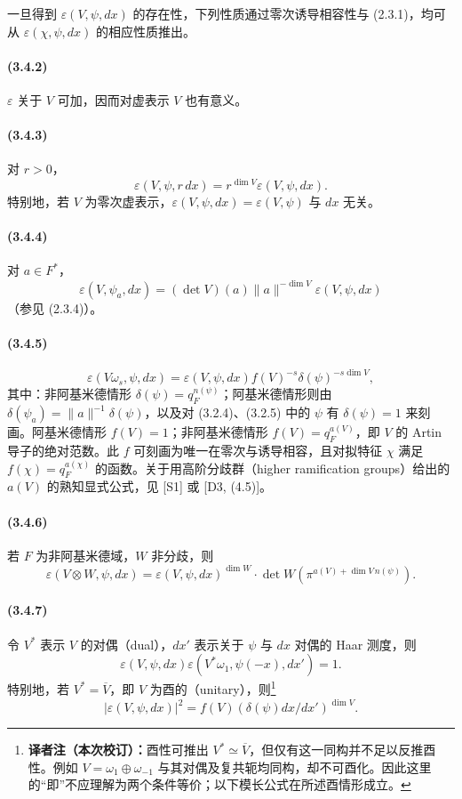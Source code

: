 一旦得到 $\varepsilon(V,\psi,dx)$ 的存在性，下列性质通过零次诱导相容性与 (2.3.1)，均可从 $\varepsilon(\chi,\psi,dx)$ 的相应性质推出。

\paragraph*{(3.4.2)} $\varepsilon$ 关于 $V$ 可加，因而对虚表示 $V$ 也有意义。
\paragraph*{(3.4.3)} 对 $r>0$，
\[
 \varepsilon(V,\psi,r\,dx)=r^{\dim V}\varepsilon(V,\psi,dx).
\]
特别地，若 $V$ 为零次虚表示，$\varepsilon(V,\psi,dx)=\varepsilon(V,\psi)$ 与 $dx$ 无关。
\paragraph*{(3.4.4)} 对 $a\in F^*$，
\[
 \varepsilon(V,\psi_a,dx)=(\det V)(a)\lVert a\rVert^{-\dim V}\varepsilon(V,\psi,dx)
\]
（参见 (2.3.4)）。
\paragraph*{(3.4.5)}
\[
 \varepsilon(V\omega_s,\psi,dx)=\varepsilon(V,\psi,dx)f(V)^{-s}\delta(\psi)^{-s\dim V},
\]
其中：非阿基米德情形 $\delta(\psi)=q_F^{n(\psi)}$；阿基米德情形则由 $\delta(\psi_a)=\lVert a\rVert^{-1}\delta(\psi)$，以及对 (3.2.4)、(3.2.5) 中的 $\psi$ 有 $\delta(\psi)=1$ 来刻画。阿基米德情形 $f(V)=1$；非阿基米德情形 $f(V)=q_F^{a(V)}$，即 $V$ 的 Artin 导子的绝对范数。此 $f$ 可刻画为唯一在零次与诱导相容，且对拟特征 $\chi$ 满足 $f(\chi)=q_F^{a(\chi)}$ 的函数。关于用高阶分歧群（higher ramification groups）给出的 $a(V)$ 的熟知显式公式，见 [S1] 或 [D3, (4.5)]。
\paragraph*{(3.4.6)} 若 $F$ 为非阿基米德域，$W$ 非分歧，则
\[
 \varepsilon(V\otimes W,\psi,dx)=\varepsilon(V,\psi,dx)^{\dim W}
 \cdot\det W(\pi^{a(V)+\dim V\,n(\psi)}).
\]
\paragraph*{(3.4.7)} 令 $V^*$ 表示 $V$ 的对偶（dual），$dx'$ 表示关于 $\psi$ 与 $dx$ 对偶的 Haar 测度，则
\[
 \varepsilon(V,\psi,dx)\varepsilon(V^*\omega_1,\psi(-x),dx')=1.
\]
特别地，若 $V^*=\overline V$，即 $V$ 为酉的（unitary），则\footnote{\textbf{译者注（本次校订）：}酉性可推出 $V^*\simeq\overline V$，但仅有这一同构并不足以反推酉性。例如 $V=\omega_1\oplus\omega_{-1}$ 与其对偶及复共轭均同构，却不可酉化。因此这里的“即”不应理解为两个条件等价；以下模长公式在所述酉情形成立。}
\[
 |\varepsilon(V,\psi,dx)|^2=f(V)(\delta(\psi)dx/dx')^{\dim V}.
\]
